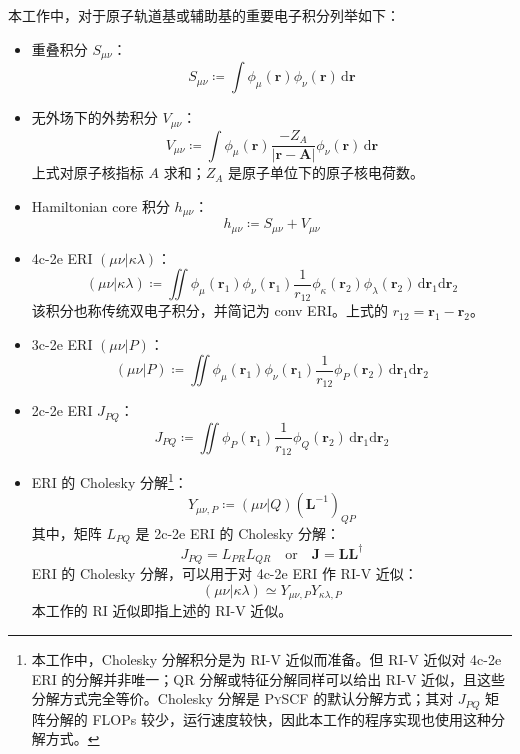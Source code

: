 本工作中，对于原子轨道基或辅助基的重要电子积分列举如下：
\begin{itemize}[nosep]
\item 重叠积分 $S_{\mu \nu}$：
\begin{equation}
    S_{\mu \nu} \coloneq \int \phi_\mu (\bm{r}) \phi_\nu (\bm{r}) \, \mathrm{d} \bm{r}
\end{equation}
\item 无外场下的外势积分 $V_{\mu \nu}$：
\begin{equation}
    V_{\mu \nu} \coloneq \int \phi_\mu (\bm{r}) \frac{- Z_A}{|\bm{r} - \bm{A}|} \phi_\nu (\bm{r}) \, \mathrm{d} \bm{r}
\end{equation}
上式对原子核指标 $A$ 求和；$Z_A$ 是原子单位下的原子核电荷数。
\item Hamiltonian core 积分 $h_{\mu \nu}$：
\begin{equation}
    h_{\mu \nu} \coloneq S_{\mu \nu} + V_{\mu \nu}
\end{equation}
\item 4c-2e ERI $(\mu \nu | \kappa \lambda)$：
\begin{equation}
    (\mu \nu | \kappa \lambda) \coloneq \iint \phi_\mu (\bm{r}_1) \phi_\nu (\bm{r}_1) \frac{1}{r_{12}} \phi_\kappa (\bm{r}_2) \phi_\lambda (\bm{r}_2) \, \mathrm{d} \bm{r}_1 \mathrm{d} \bm{r}_2
\end{equation}
该积分也称传统双电子积分，并简记为 conv ERI。上式的 $r_{12} = \bm{r}_1 - \bm{r}_2$。
\item 3c-2e ERI $(\mu \nu | P)$：
\begin{equation}
    (\mu \nu | P) \coloneq \iint \phi_\mu (\bm{r}_1) \phi_\nu (\bm{r}_1) \frac{1}{r_{12}} \phi_P (\bm{r}_2) \, \mathrm{d} \bm{r}_1 \mathrm{d} \bm{r}_2
\end{equation}
\item 2c-2e ERI $J_{PQ}$：
\begin{equation}
    J_{PQ} \coloneq \iint \phi_P (\bm{r}_1) \frac{1}{r_{12}} \phi_Q (\bm{r}_2) \, \mathrm{d} \bm{r}_1 \mathrm{d} \bm{r}_2
\end{equation}
\item ERI 的 Cholesky 分解\footnote{本工作中，Cholesky 分解积分是为 RI-V 近似而准备。但 RI-V 近似对 4c-2e ERI 的分解并非唯一；QR 分解或特征分解同样可以给出 RI-V 近似，且这些分解方式完全等价。Cholesky 分解是 \textsc{PySCF} 的默认分解方式；其对 $J_{PQ}$ 矩阵分解的 FLOPs 较少，运行速度较快，因此本工作的程序实现也使用这种分解方式。}：
\begin{equation}
    Y_{\mu \nu, P} \coloneq (\mu \nu | Q) (\mathbf{L}^{-1})_{QP}
\end{equation}
其中，矩阵 $L_{PQ}$ 是 2c-2e ERI 的 Cholesky 分解：
\begin{equation}
    J_{PQ} = L_{PR} L_{QR} \quad \text{or} \quad \mathbf{J} = \mathbf{L} \mathbf{L}^\dagger
\end{equation}
ERI 的 Cholesky 分解，可以用于对 4c-2e ERI 作 RI-V 近似：
\begin{equation}
    \label{eq.3.ri-eri-approx}
    (\mu \nu | \kappa \lambda) \simeq Y_{\mu \nu, P} Y_{\kappa \lambda, P}
\end{equation}
本工作的 RI 近似即指上述的 RI-V 近似。
\end{itemize}


